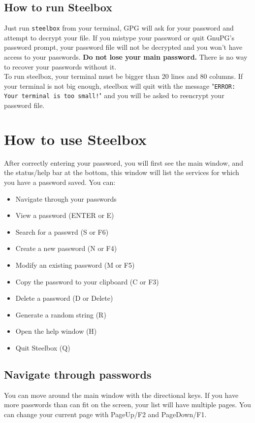 \documentclass{article}
\begin{document}
  \subsection{How to run Steelbox}
  Just run \texttt{steelbox} from your terminal, GPG will ask for your password and attempt to decrypt your file.
  If you mistype your password or quit GnuPG's password prompt, your password file will not be decrypted and
  you won't have access to your passwords. \textbf{Do not lose your main password.} There is no way to recover your passwords
  without it.\\
  To run steelbox, your terminal must be bigger than 20 lines and 80 columns. If your terminal is not big enough, steelbox
  will quit with the message "\texttt{ERROR: Your terminal is too small!}" and you will be asked to reencrypt your password file.

  \section{How to use Steelbox}
  After correctly entering your password, you will first see the main window, and the status/help bar at the bottom,
  this window will list the services for which you have a password saved. You can:
  \begin{itemize}
    \item Navigate through your passwords
    \item View a password (ENTER or E)
    \item Search for a passwrd (S or F6)
    \item Create a new password (N or F4)
    \item Modify an existing password (M or F5)
    \item Copy the password to your clipboard (C or F3)
    \item Delete a password (D or Delete)
    \item Generate a random string (R)
    \item Open the help window (H)
    \item Quit Steelbox (Q)
  \end{itemize}

  \subsection{Navigate through passwords}
  You can move around the main window with the directional keys. If you have more passwords than can fit on the screen, your list will have multiple pages.
  You can change your current page with PageUp/F2 and PageDown/F1.
\end{document}
